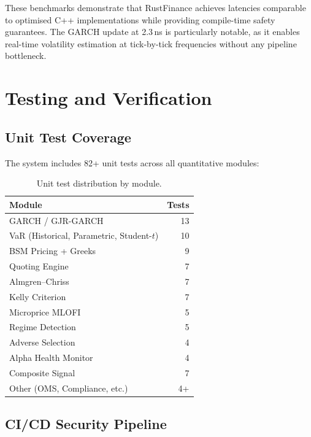 \documentclass[11pt]{article}
\theoremstyle{definition}
\begin{document}
These benchmarks demonstrate that RustFinance achieves latencies
comparable to optimised C++ implementations while providing
compile-time safety guarantees. The GARCH update at 2.3\,ns
is particularly notable, as it enables real-time volatility
estimation at tick-by-tick frequencies without any pipeline
bottleneck.

\section{Testing and Verification}
\label{sec:testing}

\subsection{Unit Test Coverage}

The system includes 82+ unit tests across all quantitative modules:

\begin{table}[H]
\centering
\caption{Unit test distribution by module.}
\label{tab:tests}
\small
\begin{tabular}{@{}lr@{}}
\toprule
\textbf{Module} & \textbf{Tests} \\
\midrule
GARCH / GJR-GARCH        & 13 \\
VaR (Historical, Parametric, Student-$t$) & 10 \\
BSM Pricing + Greeks      & 9 \\
Quoting Engine            & 7 \\
Almgren--Chriss           & 7 \\
Kelly Criterion           & 7 \\
Microprice MLOFI          & 5 \\
Regime Detection          & 5 \\
Adverse Selection         & 4 \\
Alpha Health Monitor      & 4 \\
Composite Signal          & 7 \\
Other (OMS, Compliance, etc.) & 4+ \\
\bottomrule
\end{tabular}
\end{table}

\subsection{CI/CD Security Pipeline}
\end{document}
